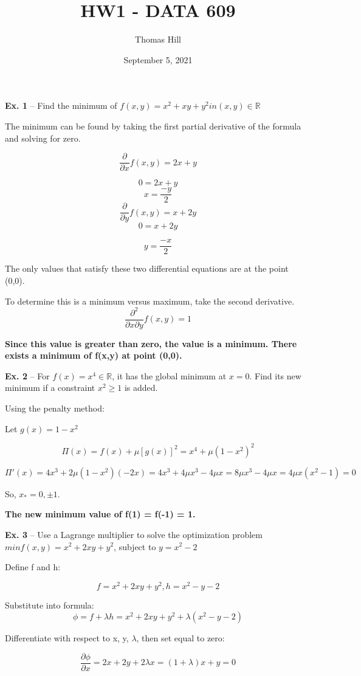\documentclass[
]{article}
\title{HW1 - DATA 609}
\author{Thomas Hill}
\date{September 5, 2021}
\begin{document}
\maketitle

\textbf{Ex. 1} -- Find the minimum of
\(f(x,y) = x^2 + xy + y^2 in (x,y) \in \mathbb{R}\)

The minimum can be found by taking the first partial derivative of the
formula and solving for zero.

\[ \frac{\partial}{\partial x} f(x,y) = 2x + y\]

\[ 0 = 2x + y \] \[ x  = \frac{-y}{2} \]
\[ \frac{\partial}{\partial y} f(x,y) = x + 2y\] \[ 0 = x + 2y \]

\[ y  = \frac{-x}{2} \]

The only values that satisfy these two differential equations are at the
point (0,0).

To determine this is a minimum versus maximum, take the second
derivative. \[ \frac {\partial ^2}{\partial x \partial y} f(x,y) = 1\]

\textbf{Since this value is greater than zero, the value is a minimum.
There exists a minimum of f(x,y) at point (0,0).}

\textbf{Ex. 2} -- For \(f(x) = x^4 \in \mathbb{R}\), it has the global
minimum at \(x = 0\). Find its new minimum if a constraint
\(x^2 \geq 1\) is added.

Using the penalty method:

Let \(g(x) = 1 - x^2\)

\[\Pi(x)  =f(x) +  \mu [g(x)]^2 = x^4 + \mu (1 - x^2)^2 \]

\[\Pi '(x) = 4x^3 + 2 \mu (1 - x^2)(-2x) = 4x^3 + 4\mu x^3 - 4\mu x = 8\mu x^3 - 4\mu x = 4\mu x(x^2 - 1)= 0\]

So, \(x_* = 0, \pm 1\).

\textbf{The new minimum value of f(1) = f(-1) = 1.}

\textbf{Ex. 3} -- Use a Lagrange multiplier to solve the optimization
problem \(min f(x,y) = x^2 + 2xy + y^2\), subject to \(y = x^2 -2\)

Define f and h:

\[ f =  x^2 + 2xy + y^2, h = x^2 - y -2\]

Substitute into formula:
\[ \phi = f + \lambda h = x^2 + 2xy + y^2 + \lambda (x^2 - y -2)\]

Differentiate with respect to x, y, \(\lambda\), then set equal to zero:

\[ \frac{\partial \phi}{\partial x} = 2x + 2y + 2\lambda x = (1 + \lambda)x + y = 0 \]
\end{document}
